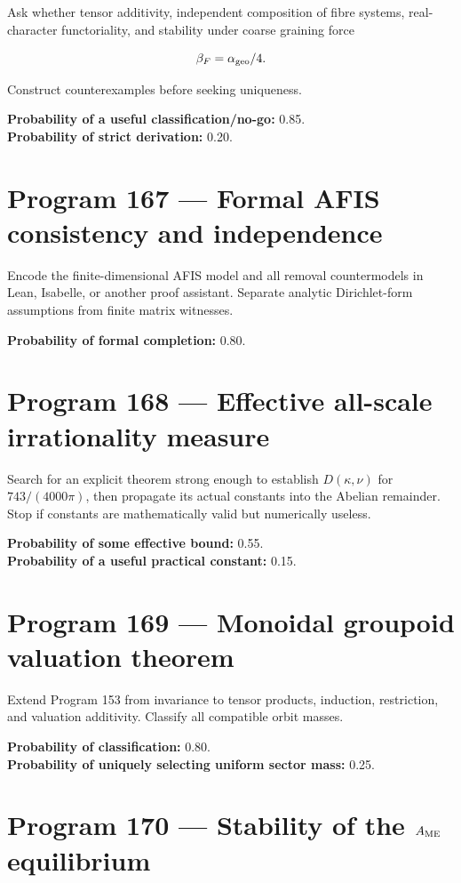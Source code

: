 \documentclass[11pt,a4paper,openany]{report}
\begin{document}
Ask whether tensor additivity, independent composition of fibre systems, real-character functoriality, and stability under coarse graining force

\[
\beta_F=\alpha_{\rm geo}/4.
\]

Construct counterexamples before seeking uniqueness.

\textbf{Probability of a useful classification/\allowbreak{}no-go:} 0.85.\\
\textbf{Probability of strict derivation:} 0.20.

\section{Program 167 --- Formal AFIS consistency and independence}

Encode the finite-dimensional AFIS model and all removal countermodels in Lean, Isabelle, or another proof assistant. Separate analytic Dirichlet-form assumptions from finite matrix witnesses.

\textbf{Probability of formal completion:} 0.80.

\section{Program 168 --- Effective all-scale irrationality measure}

Search for an explicit theorem strong enough to establish \(D(\kappa,\nu)\) for \(743/(4000\pi)\), then propagate its actual constants into the Abelian remainder. Stop if constants are mathematically valid but numerically useless.

\textbf{Probability of some effective bound:} 0.55.\\
\textbf{Probability of a useful practical constant:} 0.15.

\section{Program 169 --- Monoidal groupoid valuation theorem}

Extend Program 153 from invariance to tensor products, induction, restriction, and valuation additivity. Classify all compatible orbit masses.

\textbf{Probability of classification:} 0.80.\\
\textbf{Probability of uniquely selecting uniform sector mass:} 0.25.

\section{\texorpdfstring{Program 170 --- Stability of the \(A_{\rm ME}\) equilibrium}{Program 170 --- Stability of the A\_ ME equilibrium}}
\end{document}
